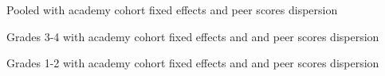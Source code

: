 \documentclass[11pt]{article}
\begin{document}
\begin{table}[H]
	\caption{Pooled with academy cohort fixed effects and peer scores dispersion}
	
\end{table}

\begin{table}[H]
	\caption{Grades 3-4 with academy cohort fixed effects and and peer scores dispersion}
	
\end{table}

\begin{table}[H]
	\caption{Grades 1-2 with academy cohort fixed effects and and peer scores dispersion}
	
\end{table}
\end{document}
